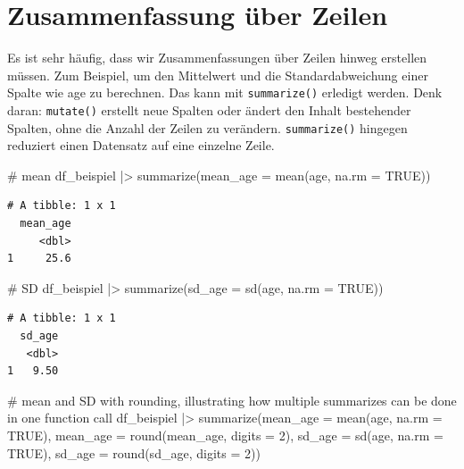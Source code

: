 \documentclass[
  letterpaper,
  DIV=11,
  numbers=noendperiod]{scrreprt}
\newenvironment{Shaded}{\begin{snugshade}}{\end{snugshade}}
\newcommand{\AttributeTok}[1]{\textcolor[rgb]{0.40,0.45,0.13}{#1}}
\newcommand{\CommentTok}[1]{\textcolor[rgb]{0.37,0.37,0.37}{#1}}
\newcommand{\ConstantTok}[1]{\textcolor[rgb]{0.56,0.35,0.01}{#1}}
\newcommand{\DecValTok}[1]{\textcolor[rgb]{0.68,0.00,0.00}{#1}}
\newcommand{\FunctionTok}[1]{\textcolor[rgb]{0.28,0.35,0.67}{#1}}
\newcommand{\NormalTok}[1]{\textcolor[rgb]{0.00,0.23,0.31}{#1}}
\newcommand{\SpecialCharTok}[1]{\textcolor[rgb]{0.37,0.37,0.37}{#1}}
\begin{document}
\chapter{Zusammenfassung über
Zeilen}\label{zusammenfassung-uxfcber-zeilen}

Es ist sehr häufig, dass wir Zusammenfassungen über Zeilen hinweg
erstellen müssen. Zum Beispiel, um den Mittelwert und die
Standardabweichung einer Spalte wie age zu berechnen. Das kann mit
\texttt{summarize()} erledigt werden. Denk daran: \texttt{mutate()}
erstellt neue Spalten oder ändert den Inhalt bestehender Spalten, ohne
die Anzahl der Zeilen zu verändern. \texttt{summarize()} hingegen
reduziert einen Datensatz auf eine einzelne Zeile.

\begin{Shaded}
\begin{Highlighting}[]
\CommentTok{\# mean}
\NormalTok{df\_beispiel }\SpecialCharTok{|\textgreater{}} \FunctionTok{summarize}\NormalTok{(}\AttributeTok{mean\_age =} \FunctionTok{mean}\NormalTok{(age, }\AttributeTok{na.rm =} \ConstantTok{TRUE}\NormalTok{))}
\end{Highlighting}
\end{Shaded}

\begin{verbatim}
# A tibble: 1 x 1
  mean_age
     <dbl>
1     25.6
\end{verbatim}

\begin{Shaded}
\begin{Highlighting}[]
\CommentTok{\# SD}
\NormalTok{df\_beispiel }\SpecialCharTok{|\textgreater{}} 
  \FunctionTok{summarize}\NormalTok{(}\AttributeTok{sd\_age =} \FunctionTok{sd}\NormalTok{(age, }\AttributeTok{na.rm =} \ConstantTok{TRUE}\NormalTok{))}
\end{Highlighting}
\end{Shaded}

\begin{verbatim}
# A tibble: 1 x 1
  sd_age
   <dbl>
1   9.50
\end{verbatim}

\begin{Shaded}
\begin{Highlighting}[]
\CommentTok{\# mean and SD with rounding, illustrating how multiple summarizes can be done in one function call}
\NormalTok{df\_beispiel }\SpecialCharTok{|\textgreater{}} 
  \FunctionTok{summarize}\NormalTok{(}\AttributeTok{mean\_age =} \FunctionTok{mean}\NormalTok{(age, }\AttributeTok{na.rm =} \ConstantTok{TRUE}\NormalTok{),}
            \AttributeTok{mean\_age =} \FunctionTok{round}\NormalTok{(mean\_age, }\AttributeTok{digits =} \DecValTok{2}\NormalTok{),}
            \AttributeTok{sd\_age =} \FunctionTok{sd}\NormalTok{(age, }\AttributeTok{na.rm =} \ConstantTok{TRUE}\NormalTok{),}
            \AttributeTok{sd\_age =} \FunctionTok{round}\NormalTok{(sd\_age, }\AttributeTok{digits =} \DecValTok{2}\NormalTok{))}
\end{Highlighting}
\end{Shaded}
\end{document}
